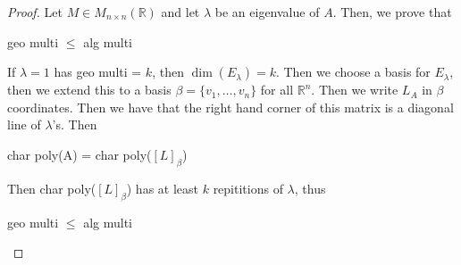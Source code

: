 \documentclass{article}
\newtheorem{one minute paper}[theorem]{One Minute Paper}
\begin{document}
\begin{proof}
    Let $M \in M_{n \times n}(\mathbb{R})$ and let $\lambda$ be an eigenvalue of $A$. Then, we prove that 
    \begin{center}
        geo multi $\leq$ alg multi
    \end{center}
    If $\lambda = 1$ has geo multi = $k$, then $\dim(E_\lambda) = k$. Then we choose a basis for $E_\lambda$, then we extend this 
    to a basis $\beta = \{v_1, \dots, v_n\}$ for all $\mathbb{R}^n$. Then we write $L_A$ in $\beta$ coordinates. Then we have that the right hand corner of this matrix is a 
    diagonal line of $\lambda$'s. Then 
    \begin{center}
        char poly(A) = char poly($[L]_\beta$)
    \end{center}
    Then char poly($[L]_\beta$) has at least $k$ repititions of $\lambda$, thus 
    \begin{center}
        geo multi $\leq$ alg multi
    \end{center}
\end{proof}
\end{document}
